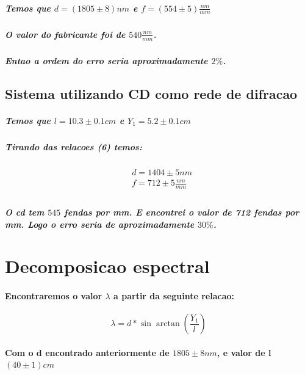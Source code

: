 \documentclass[12pt,twoside, a4paper, twocolumn]{article}
\begin{document}
\subparagraph*{Temos que $d = (1805 \pm 8) nm$ e $f = (554 \pm 5) \frac{nm}{mm}$ }

\subparagraph*{O valor do fabricante foi de  $540 \frac{nm}{mm}$.}

\subparagraph*{Entao a ordem do erro seria aproximadamente $2\%$.}

\subsection{Sistema utilizando CD como rede de difracao}

\subparagraph*{Temos que $l = 10.3 \pm 0.1 cm$ e $Y_1 = 5.2 \pm 0.1 cm$}

\subparagraph*{Tirando das relacoes (6) temos:}

\begin{equation}
  \begin{aligned}
     & d = 1404 \pm 5 nm           \\
     & f = 712 \pm 5 \frac{nm}{mm} \\
  \end{aligned}
\end{equation}

\subparagraph*{O cd tem $545$ fendas por mm. E encontrei o valor de 712 fendas por mm. Logo o erro seria de aproximadamente $30\%$.}

\newpage

\section{Decomposicao espectral}

\paragraph*{Encontraremos o valor $\lambda$ a partir da seguinte relacao:}

\begin{equation}
  \lambda = d * \sin{\arctan{\left(\frac{Y_1}{l}\right)}}
\end{equation}

\paragraph*{Com o d encontrado anteriormente de $1805 \pm 8 nm$, e valor de l $ (40 \pm 1)cm$}
\end{document}
